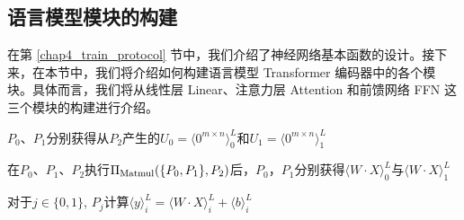 \subsection{语言模型模块的构建} \label{trans_block}

在第 \ref{chap4_train_protocol} 节中，我们介绍了神经网络基本函数的设计。接下来，在本节中，我们将介绍如何构建语言模型 Transformer 编码器中的各个模块。具体而言，我们将从线性层 Linear、注意力层 Attention 和前馈网络 FFN 这三个模块的构建进行介绍。

\begin{algorithm}[H]
	\SetAlgoLined
	
	
	$P_0$、$P_1$分别获得从$P_2$产生的$U_0=\langle 0^{m\times n}\rangle_0^L$和$U_1=\langle 0^{m\times n}\rangle_1^L$
	
	在$P_0$、$P_1$、$P_2$执行$\Pi_{\rm Matmul}(\{P_0, P_1\}, P_2)$后，$P_0$，$P_1$分别获得$\langle W\cdot X\rangle_0^L$与$\langle W\cdot X\rangle_1^L$
	
	对于$j\in \{0, 1\}$, $P_j$计算$\langle y\rangle_i^L = \langle W\cdot X\rangle_i^L + \langle b\rangle_i^L$
	
	\caption{ $\Pi_{\rm Linear}(\{P_0, P_1\}, P_2)$ }
	\label{Linear}
\end{algorithm}

